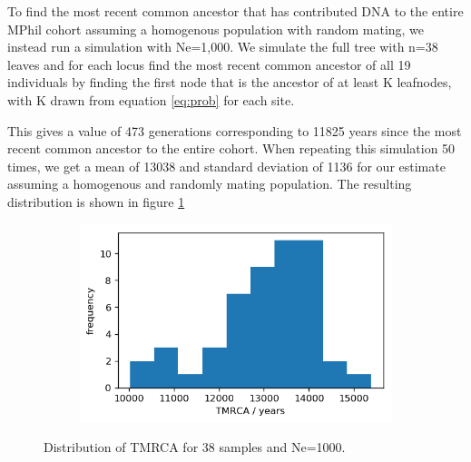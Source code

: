 \documentclass{article}
\begin{document}


To find the most recent common ancestor that has contributed DNA to the entire MPhil cohort assuming a homogenous population with random mating, we instead run a simulation with Ne=1,000. We simulate the full tree with n=38 leaves and for each locus  find the most recent common ancestor of all 19 individuals by finding the first node that is the ancestor of at least K leafnodes, with K drawn from equation \ref{eq:prob} for each site.

This gives a value of 473 generations corresponding to 11825 years since the most recent common ancestor to the entire cohort. When repeating this simulation 50 times, we get a mean of 13038 and standard deviation of 1136 for our estimate assuming a homogenous and randomly mating population. The resulting distribution is shown in figure \ref{fig:n1000_coals}
\begin{figure}[h]
	\centering
	\begin{subfigure}[t]{0.45\linewidth}
		\centering
		\includegraphics[width = 1.0\linewidth, trim={0 0 0 0}, clip=true]{figures/Ne1000_allcoal.png}
	\end{subfigure}
\caption{Distribution of TMRCA for 38 samples and Ne=1000.}
\label{fig:n1000_coals}
\end{figure}
\end{document}
